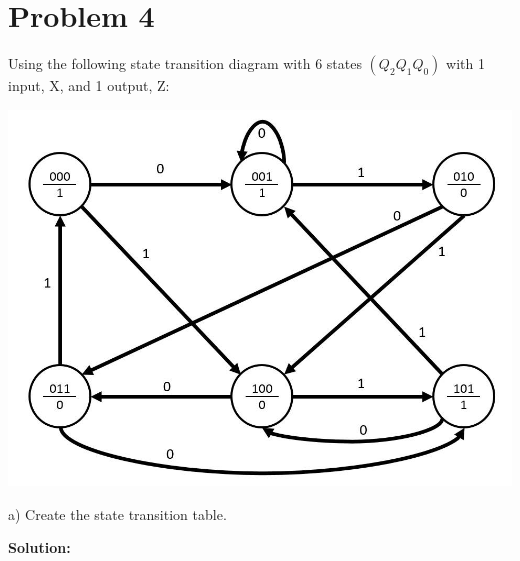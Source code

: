 \documentclass{article}
\begin{document}

    \section*{Problem 4}

    Using the following state transition diagram with 6 states $(Q_2Q_1Q_0)$ with 1 
    input, X, and 1 output, Z:

    \begin{center}
        \includegraphics[scale=1]{Q4_Question.jpg}
    \end{center}

    a) Create the state transition table.

    \textbf{Solution:}
\end{document}
